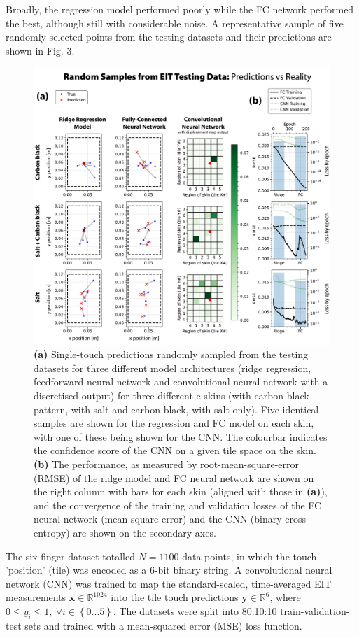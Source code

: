 Broadly, the regression model performed poorly while the FC network performed the best, although still with considerable noise. A representative sample of five randomly selected points from the testing datasets and their predictions are shown in Fig. 3.

\begin{figure}[htbp]
  \centering
  \includegraphics[width=0.9\columnwidth]{Images/Figure_3.pdf}
  \caption{\textbf{(a)} Single-touch predictions randomly sampled from the testing datasets for three different model architectures (ridge regression, feedforward neural network and convolutional neural network with a discretised output) for three different e-skins (with carbon black pattern, with salt and carbon black, with salt only). Five identical samples are shown for the regression and FC model on each skin, with one of these being shown for the CNN. The colourbar indicates the confidence score of the CNN on a given tile space on the skin. \textbf{(b)} The performance, as measured by root-mean-square-error (RMSE) of the ridge model and FC neural network are shown on the right column with bars for each skin (aligned with those in \textbf{(a)}), and the convergence of the training and validation losses of the FC neural network (mean square error) and the CNN (binary cross-entropy) are shown on the secondary axes.}
  \label{fig:proofofconcept}
\end{figure}

The six-finger dataset totalled $ N = 1100 $ data points, in which the touch 'position' (tile) was encoded as a 6-bit binary string. A convolutional neural network (CNN) was trained to map the standard-scaled, time-averaged EIT measurements $ \boldsymbol{x} \in \mathbb{R}^{1024} $ into the tile touch predictions $ \boldsymbol{y} \in \mathbb{R}^{6} $, where $ 0 \leq y_i \leq 1, \ \forall i \in \left \{  0 ... 5\right \} $. The datasets were split into 80:10:10 train-validation-test sets and trained with a mean-squared error (MSE) loss function.

